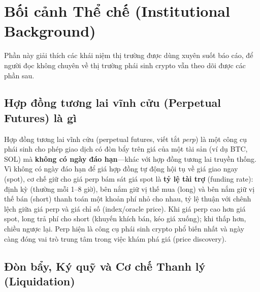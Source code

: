 \documentclass[11pt,a4paper]{article}
\begin{document}
\begin{abstract}
(ranker) mạnh nhưng là tín hiệu độ chính xác (precision) yếu dưới điều kiện mất cân bằng---điều mà ROC che giấu còn PR-AUC phơi bày. Khác với công thức chấm điểm kỹ năng ví (wallet-scoring) trước đây---nơi nhãn đánh giá gần như $99\%$ là nhiễu lấy mẫu---bài toán này có một nhãn dày đặc, đáng tin cậy, nên mức cải thiện đo được là có ý nghĩa thực chất.
\end{abstract}

\section{Bối cảnh Thể chế (Institutional Background)}
\label{sec:institutional}

Phần này giải thích các khái niệm thị trường được dùng xuyên suốt báo cáo, để người đọc không chuyên về thị trường phái sinh crypto vẫn theo dõi được các phần sau.

\subsection{Hợp đồng tương lai vĩnh cửu (Perpetual Futures) là gì}

Hợp đồng tương lai vĩnh cửu (perpetual futures, viết tắt \emph{perp}) là một công cụ phái sinh cho phép giao dịch có đòn bẩy trên giá của một tài sản (ví dụ BTC, SOL) mà \textbf{không có ngày đáo hạn}---khác với hợp đồng tương lai truyền thống. Vì không có ngày đáo hạn để giá hợp đồng tự động hội tụ về giá giao ngay (spot), cơ chế giữ cho giá perp bám sát giá spot là \textbf{tỷ lệ tài trợ} (funding rate): định kỳ (thường mỗi 1--8 giờ), bên nắm giữ vị thế mua (long) và bên nắm giữ vị thế bán (short) thanh toán một khoản phí nhỏ cho nhau, tỷ lệ thuận với chênh lệch giữa giá perp và giá chỉ số (index/oracle price). Khi giá perp cao hơn giá spot, long trả phí cho short (khuyến khích bán, kéo giá xuống); khi thấp hơn, chiều ngược lại. Perp hiện là công cụ phái sinh crypto phổ biến nhất và ngày càng đóng vai trò trung tâm trong việc khám phá giá (price discovery).

\subsection{Đòn bẩy, Ký quỹ và Cơ chế Thanh lý (Liquidation)}
\end{document}
